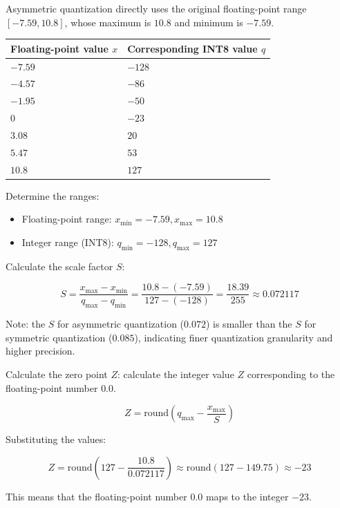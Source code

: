 Asymmetric quantization directly uses the original floating-point range \([-7.59, 10.8]\), whose maximum is \(10.8\) and minimum is \(-7.59\).

\begin{longtable}[]{@{}
  >{\raggedleft\arraybackslash}p{}
  >{\raggedleft\arraybackslash}p{}@{}}
\toprule
Floating-point value \(x\) & Corresponding INT8 value \(q\) \\
\midrule
\endhead
\(-7.59\) & \(-128\) \\
\(-4.57\) & \(-86\) \\
\(-1.95\) & \(-50\) \\
\(0\) & \(-23\) \\
\(3.08\) & \(20\) \\
\(5.47\) & \(53\) \\
\(10.8\) & \(127\) \\
\bottomrule
\end{longtable}

Determine the ranges:

\begin{itemize}
\tightlist
\item
  Floating-point range: \(x_{\min} = -7.59, x_{\max} = 10.8\)
\item
  Integer range (INT8): \(q_{\min} = -128, q_{\max} = 127\)
\end{itemize}

Calculate the scale factor \(S\):

\[
S = \frac{x_{\max} - x_{\min}}{q_{\max} - q_{\min}}
  = \frac{10.8 - (-7.59)}{127 - (-128)}
  = \frac{18.39}{255}
  \approx 0.072117
\]

Note: the \(S\) for asymmetric quantization (\(0.072\)) is smaller than the \(S\) for symmetric quantization (\(0.085\)), indicating finer quantization granularity and higher precision.

Calculate the zero point \(Z\): calculate the integer value \(Z\) corresponding to the floating-point number \(0.0\).

\[
Z = \mathrm{round}\left(q_{\max} - \frac{x_{\max}}{S}\right)
\]

Substituting the values:

\[
Z = \mathrm{round}\left(127 - \frac{10.8}{0.072117}\right)
  \approx \mathrm{round}(127 - 149.75)
  \approx -23
\]

This means that the floating-point number \(0.0\) maps to the integer \(-23\).

